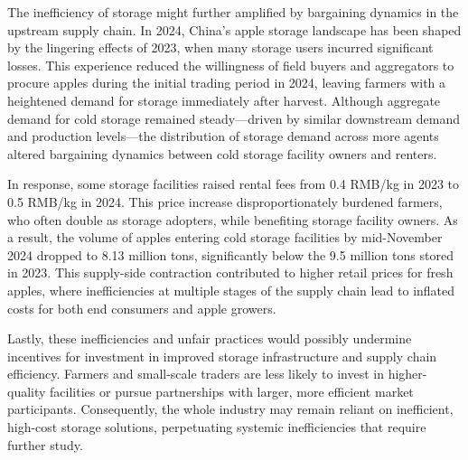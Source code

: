 The inefficiency of storage might further amplified by bargaining dynamics in the upstream supply chain. In 2024, China's apple storage landscape has been shaped by the lingering effects of 2023, when many storage users incurred significant losses. This experience reduced the willingness of field buyers and aggregators to procure apples during the initial trading period in 2024, leaving farmers with a heightened demand for storage immediately after harvest. Although aggregate demand for cold storage remained steady---driven by similar downstream demand and production levels---the distribution of storage demand across more agents altered bargaining dynamics between cold storage facility owners and renters.

In response, some storage facilities raised rental fees from 0.4 RMB/kg in 2023 to 0.5 RMB/kg in 2024. This price increase disproportionately burdened farmers, who often double as storage adopters, while benefiting storage facility owners. As a result, the volume of apples entering cold storage facilities by mid-November 2024 dropped to 8.13 million tons, significantly below the 9.5 million tons stored in 2023. This supply-side contraction contributed to higher retail prices for fresh apples, where inefficiencies at multiple stages of the supply chain lead to inflated costs for both end consumers and apple growers.

Lastly, these inefficiencies and unfair practices would possibly undermine incentives for investment in improved storage infrastructure and supply chain efficiency. Farmers and small-scale traders are less likely to invest in higher-quality facilities or pursue partnerships with larger, more efficient market participants. Consequently, the whole industry may remain reliant on inefficient, high-cost storage solutions, perpetuating systemic inefficiencies that require further study.




